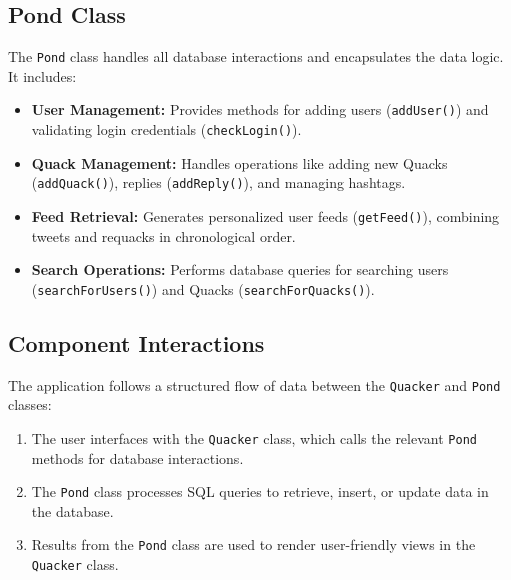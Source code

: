 \documentclass[12pt]{article}
\begin{document}
	\subsection*{Pond Class}
	The \texttt{Pond} class handles all database interactions and encapsulates the data logic. It includes:
	\begin{itemize}
		\item \textbf{User Management:} Provides methods for adding users (\texttt{addUser()}) and validating login credentials (\texttt{checkLogin()}).
		\item \textbf{Quack Management:} Handles operations like adding new Quacks (\texttt{addQuack()}), replies (\texttt{addReply()}), and managing hashtags.
		\item \textbf{Feed Retrieval:} Generates personalized user feeds (\texttt{getFeed()}), combining tweets and requacks in chronological order.
		\item \textbf{Search Operations:} Performs database queries for searching users (\texttt{searchForUsers()}) and Quacks (\texttt{searchForQuacks()}).
	\end{itemize}


	\subsection*{Component Interactions}
	The application follows a structured flow of data between the \texttt{Quacker} and \texttt{Pond} classes:
	\begin{enumerate}
		\item The user interfaces with the \texttt{Quacker} class, which calls the relevant \texttt{Pond} methods for database interactions.
		\item The \texttt{Pond} class processes SQL queries to retrieve, insert, or update data in the database.
		\item Results from the \texttt{Pond} class are used to render user-friendly views in the \texttt{Quacker} class.
	\end{enumerate}
\end{document}
